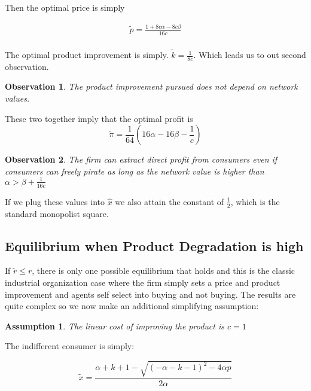 \documentclass{article}
\newtheorem{observation}{Observation}
\newtheorem{assumption}{Assumption}
\begin{document}
Then the optimal price is simply  

\begin{equation}
\begin{array}{ll}
\tilde{p} = \frac{1+8c\alpha - 8c \beta }{16c} \\
\end{array}
\end{equation}

The optimal product improvement is simply. $\tilde{k} = \frac{1}{8c}$. Which leads us to out second observation.

\begin{observation}
The product improvement pursued does not depend on network values. 
\end{observation}

These two together imply that the optimal profit is
\begin{equation}
\tilde{\pi} = \frac{1}{64} (16 \alpha-16 \beta- \frac{1}{c})
\end{equation} 

\begin{observation}
The firm can extract direct profit from consumers even if consumers can freely pirate as long as the network value is higher than $\alpha>\beta + \frac{1}{ 16c}$
\end{observation}

If we plug these values into $\hat{x}$ we also attain the constant of $\frac{1}{2}$, which is the standard monopolist square. 

\subsection{ Equilibrium when Product Degradation is high}

If $\tilde{r} \leq r$, there is only one possible equilibrium that holds and this is the classic industrial organization case where the firm simply sets a price and product improvement and agents self select into buying and not buying. The results are quite complex so we now make an additional simplifying assumption:

\begin{assumption}
The linear cost of improving the product is $c = 1$
\end{assumption}

The indifferent consumer is simply:

\begin{equation*}
\tilde{x} = \frac{\alpha+k+1-\sqrt{(-\alpha-k-1)^2-4 \alpha p}}{2 \alpha}
\end{equation*}
\end{document}
